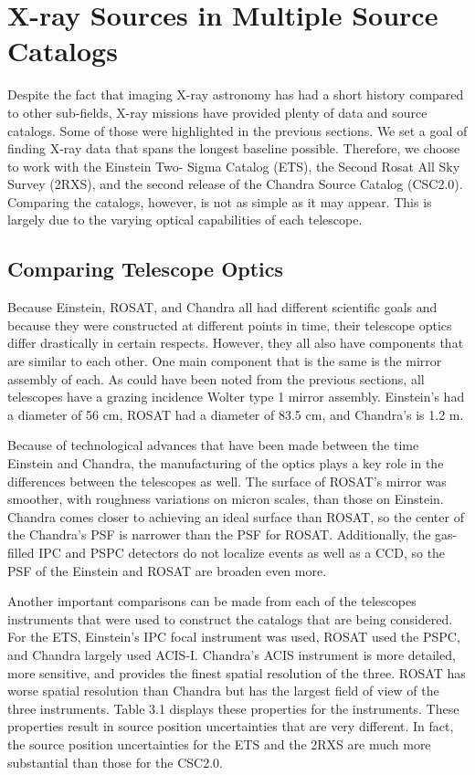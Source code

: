 \chapter{X-ray Sources in Multiple Source Catalogs}
\label{chap3}

Despite the fact that imaging X-ray astronomy has had a short history compared to other sub-fields, X-ray missions have provided plenty of data and source catalogs. 
Some of those were highlighted in the previous sections. 
We set a goal of finding X-ray data that spans the longest baseline possible.
Therefore, we choose to work with the Einstein Two- Sigma Catalog (ETS), the Second Rosat All Sky Survey (2RXS), and the second release of the Chandra Source Catalog (CSC2.0). 
Comparing the catalogs, however, is not as simple as it may appear. 
This is largely due to the varying optical capabilities of each telescope.

\section{Comparing Telescope Optics}
\label{sub3_1}

Because Einstein, ROSAT, and Chandra all had different scientific goals and because they were constructed at different points in time, their telescope optics differ drastically in certain respects. 
However, they all also have components that are similar to each other. 
One main component that is the same is the mirror assembly of each. 
As could have been noted from the previous sections, all telescopes have a grazing incidence Wolter type 1 mirror assembly.
Einstein’s had a diameter of 56 cm, ROSAT had a diameter of 83.5 cm, and Chandra’s is 1.2 m.

Because of technological advances that have been made between the time Einstein and Chandra, the manufacturing of the optics plays a key role in the differences between the telescopes as well.
The surface of ROSAT's mirror was smoother, with roughness variations on micron scales, than those on Einstein. 
Chandra comes closer to achieving an ideal surface than ROSAT, so the center of the Chandra's PSF is narrower than the PSF for ROSAT. Additionally, the gas-filled IPC and PSPC detectors do not localize events as well as a CCD, so the PSF of the Einstein and ROSAT are broaden even more.

Another important comparisons can be made from each of the telescopes instruments that were used to construct the catalogs that are being considered. 
For the ETS, Einstein’s IPC focal instrument was used, ROSAT used the PSPC, and Chandra largely used ACIS-I. 
Chandra’s ACIS instrument is more detailed, more sensitive, and provides the finest spatial resolution of the three.
ROSAT has worse spatial resolution than Chandra but has the largest field of view of the three instruments.
Table 3.1 displays these properties for the instruments. 
These properties result in source position uncertainties that are very different. 
In fact, the source position uncertainties for the ETS and the 2RXS are much more substantial than those for the CSC2.0.


